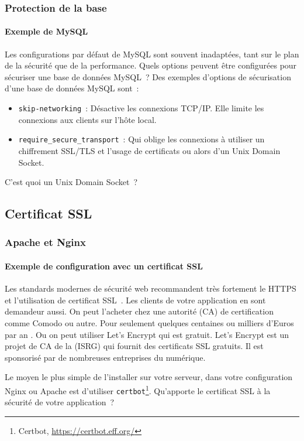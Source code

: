 \documentclass{beamer}
\begin{document}
    \begin{frame}
        \frametitle{Protection de la base}
        \framesubtitle{Exemple de MySQL}
        \transdissolve
        Les configurations par défaut de MySQL sont souvent inadaptées, tant sur le plan de la sécurité que de la performance.
        \bigbreak
        Quels options peuvent être configurées pour sécuriser une base de données MySQL~?
        \pause
        \bigbreak
        Des exemples d'options de sécurisation d'une base de données MySQL sont~:
        \begin{itemize}
            \item \lstinline{skip-networking}~: Désactive les connexions TCP/IP.
            Elle limite les connexions aux clients sur l'hôte local.
            \item \lstinline{require_secure_transport}~: Qui oblige les connexions à utiliser un chiffrement SSL/TLS et l'usage de certificats ou alors d'un Unix Domain Socket.
        \end{itemize}
        C'est quoi un Unix Domain Socket~?
    \end{frame}

    \subsection{Certificat SSL}\label{subsec:certificat-ssl}
    \begin{frame}
        \transdissolve
        \frametitle{Apache et Nginx}
        \framesubtitle{Exemple de configuration avec un certificat SSL}
        Les standards modernes de sécurité web recommandent très fortement le HTTPS et l'utilisation de certificat SSL~.
        Les clients de votre application en sont demandeur aussi.
        \bigbreak
        On peut l'acheter chez une autorité (CA) de certification comme Comodo ou autre.
        Pour seulement quelques centaines ou milliers d'Euros par an .
        Ou on peut utiliser Let's Encrypt qui est gratuit.
        \bigbreak
        Let's Encrypt est un projet de CA de la  (ISRG) qui fournit des certificats SSL gratuits.
        Il est sponsorisé par de nombreuses entreprises du numérique.

        Le moyen le plus simple de l'installer sur votre serveur, dans votre configuration Nginx ou Apache est d'utiliser \lstinline{certbot}\footnote{Certbot, \url{https://certbot.eff.org/}}.
        \bigbreak
        Qu'apporte le certificat SSL à la sécurité de votre application~?
    \end{frame}
\end{document}
